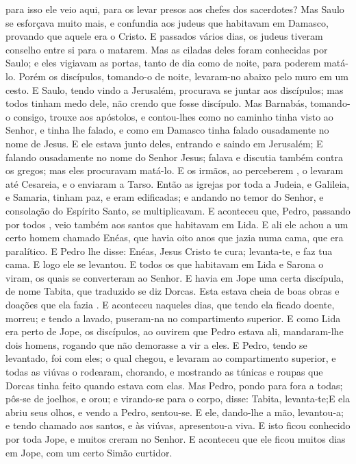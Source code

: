 {{} para isso
{} ele veio aqui, para os levar presos aos chefes dos sacerdotes?
Mas Saulo se esforçava muito mais, e confundia aos judeus que habitavam em Damasco, provando que aquele era o Cristo.
E passados vários dias, os judeus tiveram conselho entre si para o matarem.
Mas as ciladas deles foram conhecidas por Saulo; e eles vigiavam as portas, tanto de dia como de noite, para poderem matá-lo.
Porém os discípulos, tomando-o de noite, levaram-no abaixo pelo muro em um cesto.
E Saulo, tendo vindo a Jerusalém, procurava se juntar aos discípulos; mas todos tinham medo dele, não crendo que fosse discípulo.
Mas Barnabás, tomando-o consigo, trouxe
{} aos apóstolos, e contou-lhes como no caminho tinha visto ao Senhor, e tinha lhe falado, e como em Damasco tinha falado ousadamente no nome de Jesus.
E ele estava junto deles, entrando e saindo em Jerusalém;
E falando ousadamente no nome do Senhor Jesus; falava e discutia também contra os gregos; mas eles procuravam matá-lo.
E os irmãos, ao perceberem
{} , o levaram até Cesareia, e o enviaram a Tarso.
Então as igrejas por toda a Judeia, e Galileia, e Samaria, tinham paz, e eram edificadas; e andando no temor do Senhor, e
{} consolação do Espírito Santo, se multiplicavam.
E aconteceu que, Pedro, passando por todos
{} , veio também aos santos que habitavam em Lida.
E ali ele achou a um certo homem chamado Enéas, que havia oito anos que jazia numa cama, que era paralítico.
E Pedro lhe disse: Enéas, Jesus Cristo te cura; levanta-te, e faz tua cama. E logo ele se levantou.
E todos os que habitavam em Lida e Sarona o viram, os quais se converteram ao Senhor.
E havia em Jope uma certa discípula, de nome Tabita, que traduzido se diz Dorcas.
 Esta estava cheia de boas obras e doações que ela fazia
{} .
E aconteceu naqueles dias, que tendo ela ficado doente, morreu; e tendo a lavado, puseram-na no compartimento superior.
E como Lida era perto de Jope, os discípulos, ao ouvirem que Pedro estava ali, mandaram-lhe dois homens, rogando
{} que não demorasse a vir a eles.
E Pedro, tendo se levantado, foi com eles; o qual chegou, e
{} levaram ao compartimento superior, e todas as viúvas o rodearam, chorando, e mostrando
{} as túnicas e roupas que Dorcas tinha feito quando estava com elas.
Mas Pedro, pondo para fora a todas; pôs-se de joelhos, e orou; e virando-se para o corpo, disse: Tabita, levanta-te;E ela abriu seus olhos, e vendo a Pedro, sentou-se.
E ele, dando-lhe a mão, levantou-a; e tendo chamado aos santos, e às viúvas, apresentou-a viva.
E isto ficou conhecido por toda Jope, e muitos creram no Senhor.
E aconteceu que ele ficou muitos dias em Jope, com um certo Simão curtidor.

}
